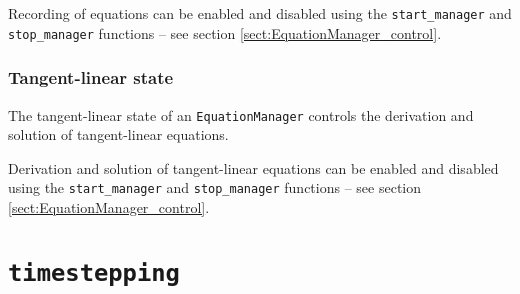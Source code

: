 \documentclass[11pt]{article}
\begin{document}
Recording of equations can be enabled and disabled using the
\texttt{start\_manager} and \texttt{stop\_manager} functions  -- see section
\ref{sect:EquationManager_control}.

\subsubsection{Tangent-linear state}

The tangent-linear state of an \texttt{EquationManager} controls the derivation
and solution of tangent-linear equations.

Derivation and solution of tangent-linear equations can be enabled and disabled
using the \texttt{start\_manager} and \texttt{stop\_manager} functions  -- see
section \ref{sect:EquationManager_control}.

\section{\texttt{timestepping}}
\end{document}
